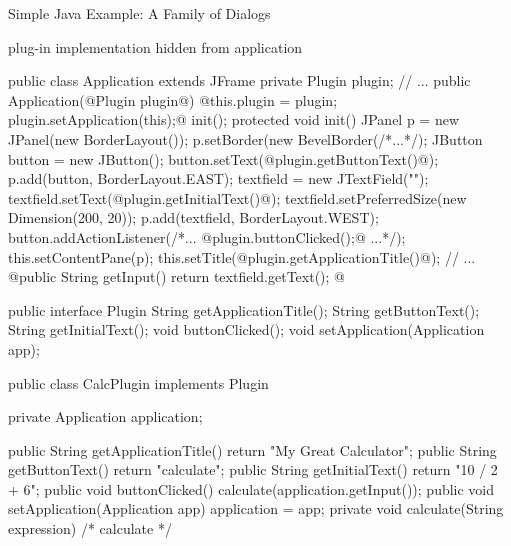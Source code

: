 \begin{frame}[fragile]{Simple Java Example: A Family of Dialogs}
	\vspace{-2mm}
	\begin{mycolumns}
		\begin{note}{}
			plug-in implementation hidden from application
		\end{note}
\begin{codetight}[basicstyle=\tiny]{}
public class Application extends JFrame {
	private Plugin plugin;
	// ...
	public Application(@Plugin plugin@) {
		@this.plugin = plugin;
		plugin.setApplication(this);@
		init();
	}
	protected void init() {
		JPanel p = new JPanel(new BorderLayout());
		p.setBorder(new BevelBorder(/*...*/);
		JButton button = new JButton();
		button.setText(@plugin.getButtonText()@);
		p.add(button, BorderLayout.EAST);
		textfield = new JTextField("");
		textfield.setText(@plugin.getInitialText()@);
		textfield.setPreferredSize(new Dimension(200, 20));
		p.add(textfield, BorderLayout.WEST);		
		button.addActionListener(/*... @plugin.buttonClicked();@ ...*/);
		this.setContentPane(p);		
		this.setTitle(@plugin.getApplicationTitle()@);
		// ...
	}
	@public String getInput() {
		return textfield.getText();
	}@
}
\end{codetight}
		\mynextcolumn
{
\begin{codetight}[basicstyle=\tiny]{}
public interface Plugin {
	String getApplicationTitle();
	String getButtonText();
	String getInitialText();
	void buttonClicked();
	void setApplication(Application app);
}
\end{codetight}
\begin{codetight}[basicstyle=\tiny]{}
public class CalcPlugin implements Plugin {
	private Application application;

	public String getApplicationTitle() {
		return "My Great Calculator";
	}
	public String getButtonText() {
		return "calculate";
	}
	public String getInitialText() {
		return "10 / 2 + 6";
	}
	public void buttonClicked() {
		calculate(application.getInput());
	}
	public void setApplication(Application app) {
		application = app;
	}
	private void calculate(String expression) {
		/* calculate */
	}
}
\end{codetight}
}
	\end{mycolumns}
\end{frame}

